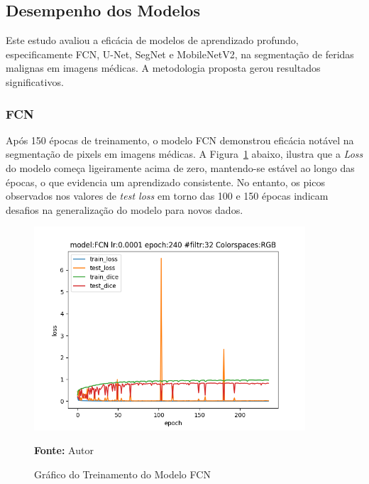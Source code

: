 \subsection{Desempenho dos Modelos}

    
    
Este estudo avaliou a eficácia de modelos de aprendizado profundo, especificamente \ac{FCN}, \ac{U-Net}, \ac{SegNet} e \ac{MobileNetV2}, na segmentação de feridas malignas em imagens médicas. A metodologia proposta gerou resultados significativos.
    
\subsubsection{FCN}
Após 150 épocas de treinamento, o modelo \ac{FCN} demonstrou eficácia notável na segmentação de pixels em imagens médicas. A Figura~\ref{fig:graphFCN} abaixo, ilustra que a \textit{Loss} do modelo começa ligeiramente acima de zero, mantendo-se estável ao longo das épocas, o que evidencia um aprendizado consistente. No entanto, os picos observados nos valores de \textit{test loss} em torno das 100 e 150 épocas indicam desafios na generalização do modelo para novos dados.

\begin{figure}[htbp]
    \centering
    \caption{Gráfico do Treinamento do Modelo \acf{FCN}}
    \includegraphics[width=0.9\textwidth]{img/fcnmodelfile.png}
    \label{fig:graphFCN}
    \par\medskip\textbf{Fonte:} Autor
\end{figure}

